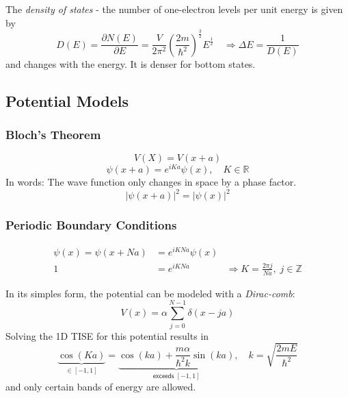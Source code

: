 \newpar{}

The \textit{density of states} - the number of one-electron levels per unit energy is given by
\noindent\begin{equation*}
    D(E)=\frac{\partial N(E)}{\partial E} = \frac{V}{2\pi^2}{\left(\frac{2m}{\hbar^2}\right)}^{\frac{3}{2}} E^{\frac{1}{2}} \quad \Rightarrow \Delta E = \frac{1}{D(E)}
\end{equation*}
and changes with the energy. It is denser for bottom states.

\subsection{Potential Models}
\subsubsection{Bloch's Theorem}
\noindent\begin{equation*}
    V(X) = V(x+a)
\end{equation*}
\noindent\begin{equation*}
    \psi(x+a) = e^{iKa} \psi(x), \quad K\in \mathbb{R}
\end{equation*}
In words: The wave function only changes in space by a phase factor.
\noindent\begin{equation*}
    {|\psi(x+a)|}^2={|\psi(x)|}^2
\end{equation*}

\subsubsection{Periodic Boundary Conditions}
\noindent\begin{align*}
    \psi(x) = \psi(x+Na) & = e^{iKNa}\psi(x)                                                       \\
    1                    & =e^{iKNa}         & \Rightarrow K=\frac{2\pi j}{Na}, \; j\in \mathbb{Z}
\end{align*}


In its simples form, the potential can be modeled with a \textit{Dirac-comb}:
\noindent\begin{equation*}
    V(x)=\alpha\sum_{j=0}^{N-1}\delta(x-ja)
\end{equation*}
Solving the 1D TISE for this potential results in
\noindent\begin{equation*}
    \underbrace{\cos(Ka)}_{\in [-1,1]} = \underbrace{\cos(ka) + \frac{m\alpha}{\hbar^2 k}\sin(ka)}_{\textsf{exceeds }[-1,1]}, \quad k=\sqrt{\frac{2mE}{\hbar^2}}
\end{equation*}
and only certain bands of energy are allowed.

